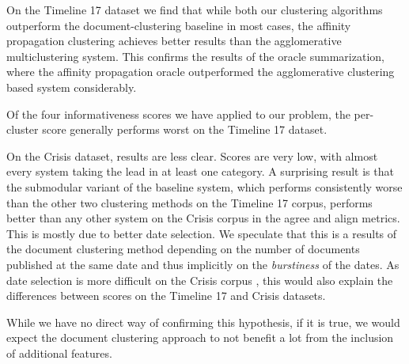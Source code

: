 \documentclass[a4paper,BCOR=10mm]{report}
\numberwithin{lemma}{chapter}
\numberwithin{definition}{chapter}
\begin{document}
On the Timeline 17 dataset we find that while both our clustering algorithms outperform the document-clustering baseline in most cases, the affinity propagation clustering achieves better results than the agglomerative multiclustering system. This confirms the results of the oracle summarization, where the affinity propagation oracle outperformed the agglomerative clustering based system considerably.

Of the four informativeness scores we have applied to our problem, the per-cluster score generally performs worst on the Timeline 17 dataset.

On the Crisis dataset, results are less clear.
Scores are very low, with almost every system taking the lead in at least one category.
A surprising result is that the submodular variant of the baseline system, which performs consistently worse than the other two clustering methods on the Timeline 17 corpus, performs better than any other system on the Crisis corpus in the agree and align metrics.
This is mostly due to better date selection.
We speculate that this is a results of the document clustering method depending on the number of documents published at the same date and thus implicitly on the \textit{burstiness} of the dates.
As date selection is more difficult on the Crisis corpus \citep{markert}, this would also explain the differences between scores on the Timeline 17 and Crisis datasets.

While we have no direct way of confirming this hypothesis, if it is true, we would expect the document clustering approach to not benefit a lot from the inclusion of additional features.
\end{document}
